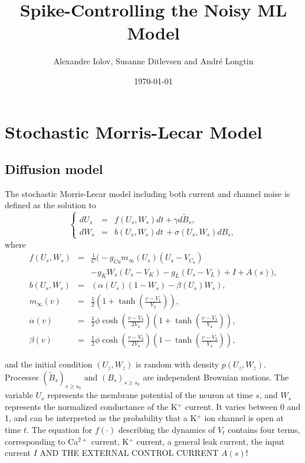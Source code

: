 \documentclass{article}
\begin{document}
\title{Spike-Controlling the Noisy ML Model} 

\author{Alexandre Iolov, 
Susanne Ditlevsen 
and
Andr\'e Longtin
}
\date{\today}

\maketitle 

\tableofcontents

\section{Stochastic Morris-Lecar Model}
\subsection{Diffusion model}
\def \Vt {{ U_s }} \def \Wt {{ W_s }} \def \Vz {{ U_z}} \def \Wz {{ W_z}} The
stochastic Morris-Lecar model including both current and channel noise is
defined as the solution to
\begin{equation}
\left\{
\begin{array}{ccl}
d\Vt &=& f(\Vt,\Wt)dt +\gamma d\tilde{B}_s,\\
d\Wt&=&b(\Vt,\Wt) dt  \, + \sigma(\Vt,\Wt)dB_s,
\end{array}
\right.
\tag{ML}
\label{eq:ML}
\end{equation}
where 
\begin{eqnarray*}
f(\Vt,\Wt)&=&\frac{1}{C}\Big(-g_{Ca}m_\infty(\Vt) (\Vt-V_{C_a})
\\ && - g_K\Wt(\Vt-V_K)
-g_L(\Vt-V_L)+I + A(s) \Big),
\\ b(\Vt,\Wt)&=&
\left(\alpha(\Vt)(1-\Wt) - \beta(\Vt)\Wt\right),\\ m_\infty(v)&=&\frac{1}{2}\left(1+\tanh\left(\frac{v-V_1}{V_2}\right)\right),\\
\alpha(v) &=& \frac{1}{2}\phi \cosh\left(\frac{v-V_3}{2V_4}\right)\left(1+\tanh\left(\frac{v-V_3}{V_4}\right)\right),\\
\beta(v) &=& \frac{1}{2}\phi \cosh\left(\frac{v-V_3}{2V_4}\right)\left(1-\tanh\left(\frac{v-V_3}{V_4}\right)\right),
\end{eqnarray*}

and the initial condition $(\Vz, \Wz)$ is random  with density $p(\Vz, \Wz)$.
 Processes $(\tilde{B}_s)_{s\geq s_0}$ and $(B_s)_{s\geq s_0}$ are independent
 Brownian motions.
The variable $\Vt$ represents the membrane potential of the neuron at time $s$,
and $\Wt$ represents the normalized conductance of the K$^+$ current. It varies
between 0 and 1, and can be interpreted as the probability that a K$^+$ ion
channel is open at time $t$. The equation for $f(\cdot)$ describing the dynamics
of $V_t$ contains four terms, corresponding to Ca$^{2+}$ current, K$^+$ current,
a general leak current, the input current $I$ AND THE EXTERNAL CONTROL CURRENT
$A(s)$!
  
\end{document}
